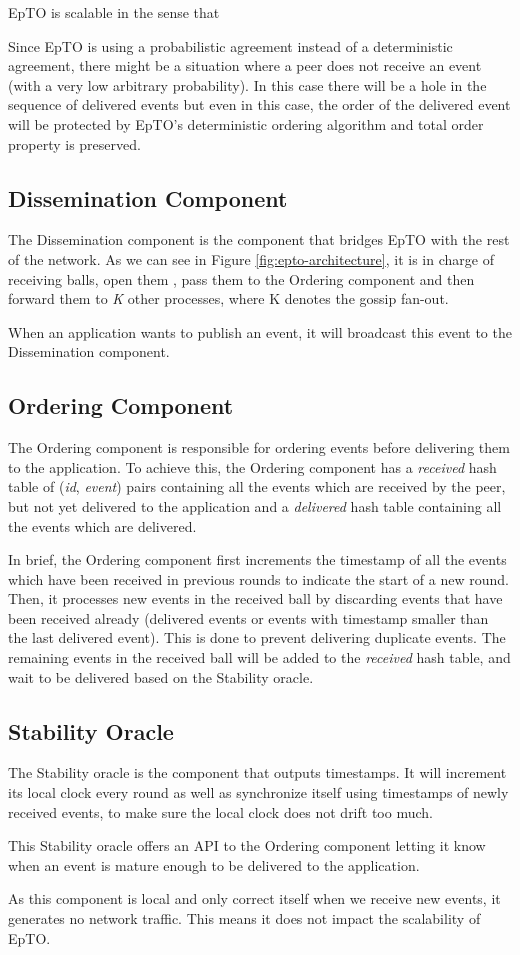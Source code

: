 \documentclass[10pt,conference,a4paper]{IEEEtran}
\begin{document}
EpTO is scalable in the sense that 

\par
Since EpTO is using a probabilistic agreement instead of a deterministic agreement, there might be a situation where a peer does not receive an event (with a very low arbitrary probability). In this case there will be a hole in the sequence of delivered events but even in this case, the order of the delivered event will be protected by EpTO's deterministic ordering algorithm and total order property is preserved.
\subsection{Dissemination Component}
The Dissemination component is the component that bridges EpTO with the rest of the network. As we can see in Figure \ref*{fig:epto-architecture}, it is in charge of receiving balls, open them , pass them to the Ordering component and then forward them to \textit{K} other processes, where K denotes the gossip fan-out.
\par
When an application wants to publish an event, it will broadcast this event to the Dissemination component.

\subsection{Ordering Component}
The Ordering component is responsible for ordering events before delivering them to the application.
To achieve this, the Ordering component has a \textit{received} hash table of (\textit{id}, \textit{event}) pairs containing all the events which are received by the peer, but not yet delivered to the application and a \textit{delivered} hash table containing all the events which are delivered.
\par
In brief, the Ordering component first increments the timestamp of all the events which have been received in previous rounds to indicate the start of a new round. Then, it processes new events in the received ball by discarding events that have been received already (delivered events or events with timestamp smaller than the last delivered event). This is done to prevent delivering duplicate events. The remaining events in the received ball will be added to the \textit{received} hash table, and wait to be delivered based on the Stability oracle.
\subsection{Stability Oracle}
The Stability oracle is the component that outputs timestamps. It will increment its local clock every round as well as synchronize itself using timestamps of newly received events, to make sure the local clock does not drift too much.
\par
This Stability oracle offers an API to the Ordering component letting it know when an event is mature enough to be delivered to the application.
\par
As this component is local and only correct itself when we receive new events, it generates no network traffic. This means it does not impact the scalability of EpTO.
\end{document}
